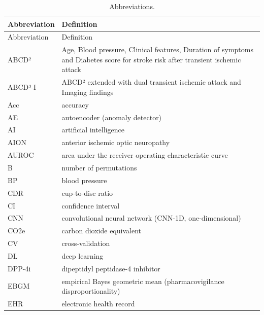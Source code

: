 \documentclass[
  11pt,
]{article}
\begin{document}
\begin{longtable}[]{@{}
  >{\raggedright\arraybackslash}p{}
  >{\raggedright\arraybackslash}p{}@{}}
\caption{Abbreviations.}\tabularnewline
\toprule\noalign{}
\begin{minipage}[b]{\linewidth}\raggedright
Abbreviation
\end{minipage} & \begin{minipage}[b]{\linewidth}\raggedright
Definition
\end{minipage} \\
\midrule\noalign{}
\endfirsthead
\toprule\noalign{}
\begin{minipage}[b]{\linewidth}\raggedright
Abbreviation
\end{minipage} & \begin{minipage}[b]{\linewidth}\raggedright
Definition
\end{minipage} \\
\midrule\noalign{}
\endhead
\bottomrule\noalign{}
\endlastfoot
ABCD² & Age, Blood pressure, Clinical features, Duration of symptoms and
Diabetes score for stroke risk after transient ischemic attack \\
ABCD³-I & ABCD² extended with dual transient ischemic attack and Imaging
findings \\
Acc & accuracy \\
AE & autoencoder (anomaly detector) \\
AI & artificial intelligence \\
AION & anterior ischemic optic neuropathy \\
AUROC & area under the receiver operating characteristic curve \\
B & number of permutations \\
BP & blood pressure \\
CDR & cup-to-disc ratio \\
CI & confidence interval \\
CNN & convolutional neural network (CNN-1D, one-dimensional) \\
CO2e & carbon dioxide equivalent \\
CV & cross-validation \\
DL & deep learning \\
DPP-4i & dipeptidyl peptidase-4 inhibitor \\
EBGM & empirical Bayes geometric mean (pharmacovigilance
disproportionality) \\
EHR & electronic health record \\

\end{longtable}
\end{document}
